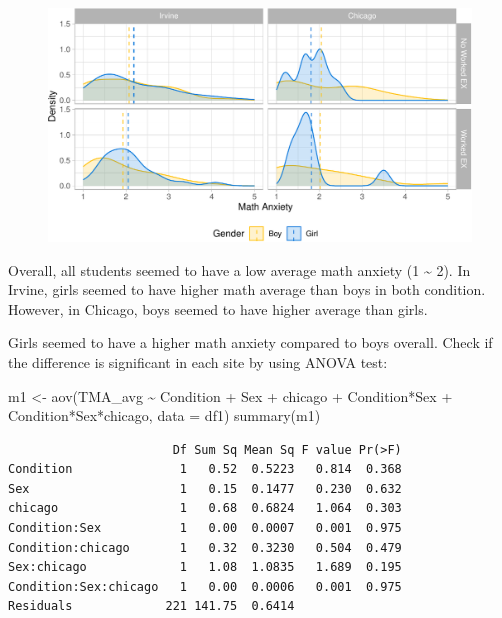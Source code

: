 \documentclass[
  letterpaper,
  DIV=11,
  numbers=noendperiod]{scrartcl}
\newenvironment{Shaded}{\begin{snugshade}}{\end{snugshade}}
\newcommand{\AttributeTok}[1]{\textcolor[rgb]{0.49,0.56,0.16}{#1}}
\newcommand{\FunctionTok}[1]{\textcolor[rgb]{0.02,0.16,0.49}{#1}}
\newcommand{\NormalTok}[1]{\textcolor[rgb]{0.00,0.44,0.13}{#1}}
\newcommand{\OtherTok}[1]{\textcolor[rgb]{0.00,0.44,0.13}{#1}}
\newcommand{\SpecialCharTok}[1]{\textcolor[rgb]{0.25,0.44,0.63}{#1}}
\begin{document}
\begin{figure}[H]

{\centering \includegraphics{sampling_files/figure-pdf/unnamed-chunk-13-1.pdf}

}

\end{figure}

Overall, all students seemed to have a low average math anxiety (1
\textasciitilde{} 2). In Irvine, girls seemed to have higher math
average than boys in both condition. However, in Chicago, boys seemed to
have higher average than girls.

Girls seemed to have a higher math anxiety compared to boys overall.
Check if the difference is significant in each site by using ANOVA test:

\begin{Shaded}
\begin{Highlighting}[]
\NormalTok{m1 }\OtherTok{\textless{}{-}}  \FunctionTok{aov}\NormalTok{(TMA\_avg }\SpecialCharTok{\textasciitilde{}}\NormalTok{ Condition }\SpecialCharTok{+}\NormalTok{ Sex }\SpecialCharTok{+}\NormalTok{ chicago }\SpecialCharTok{+} 
\NormalTok{             Condition}\SpecialCharTok{*}\NormalTok{Sex }\SpecialCharTok{+}\NormalTok{ Condition}\SpecialCharTok{*}\NormalTok{Sex}\SpecialCharTok{*}\NormalTok{chicago,}
           \AttributeTok{data =}\NormalTok{ df1)}
\FunctionTok{summary}\NormalTok{(m1)}
\end{Highlighting}
\end{Shaded}

\begin{verbatim}
                       Df Sum Sq Mean Sq F value Pr(>F)
Condition               1   0.52  0.5223   0.814  0.368
Sex                     1   0.15  0.1477   0.230  0.632
chicago                 1   0.68  0.6824   1.064  0.303
Condition:Sex           1   0.00  0.0007   0.001  0.975
Condition:chicago       1   0.32  0.3230   0.504  0.479
Sex:chicago             1   1.08  1.0835   1.689  0.195
Condition:Sex:chicago   1   0.00  0.0006   0.001  0.975
Residuals             221 141.75  0.6414               
\end{verbatim}
\end{document}
